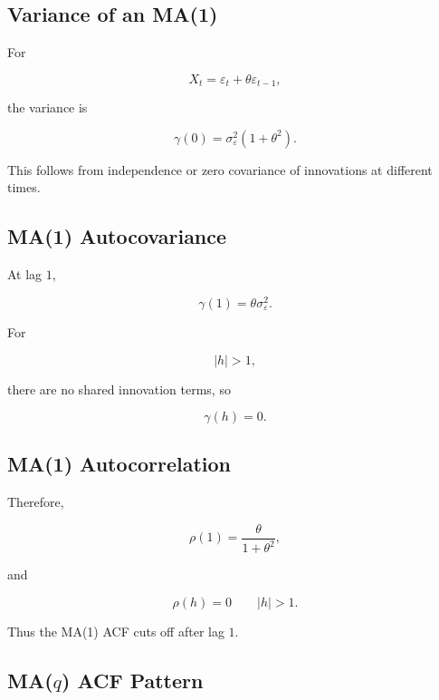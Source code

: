 \subsection{Variance of an MA(1)}
\label{subsec:ma1-variance}

For

\[
X_t
=
\varepsilon_t
+
\theta\varepsilon_{t-1},
\]

the variance is

\[
\boxed{
\gamma(0)
=
\sigma_\varepsilon^2
(
1+\theta^2
).
}
\]

This follows from independence or zero covariance of innovations at
different times.

\subsection{MA(1) Autocovariance}
\label{subsec:ma1-autocovariance}

At lag \(1\),

\[
\boxed{
\gamma(1)
=
\theta
\sigma_\varepsilon^2.
}
\]

For

\[
|h|>1,
\]

there are no shared innovation terms, so

\[
\boxed{
\gamma(h)=0.
}
\]

\subsection{MA(1) Autocorrelation}
\label{subsec:ma1-autocorrelation}

Therefore,

\[
\boxed{
\rho(1)
=
\frac{
\theta
}{
1+\theta^2
},
}
\]

and

\[
\boxed{
\rho(h)=0
\qquad
|h|>1.
}
\]

Thus the MA(1) ACF cuts off after lag \(1\).

\subsection{MA(\(q\)) ACF Pattern}
\label{subsec:maq-acf-pattern}

